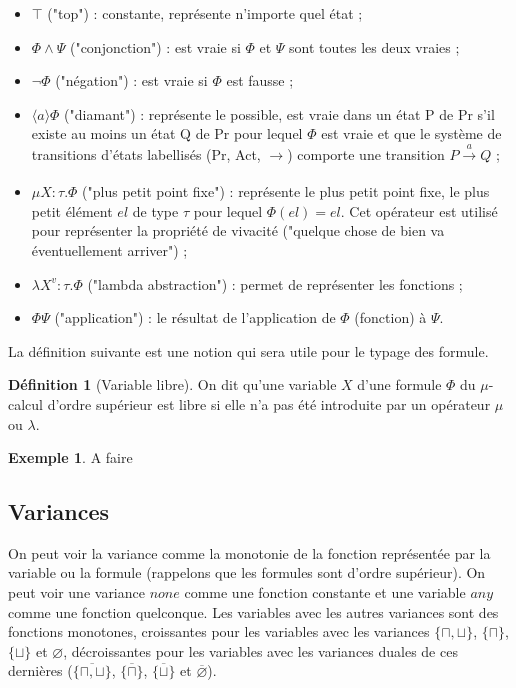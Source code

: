 \documentclass{rapport}
\theoremstyle{plain}
\theoremstyle{remark}
\theoremstyle{definition}
\newtheorem{dfn}{Définition}
\newtheorem{exem}{Exemple}
\begin{document}
\begin{itemize}
  \item $\top$ ("top") : constante, représente n'importe quel état ;
  \item $\Phi \wedge \Psi$ ("conjonction") : est vraie si $\Phi$ et $\Psi$ sont toutes les deux vraies ;
  \item $\neg\Phi$ ("négation") : est vraie si $\Phi$ est fausse ;
  \item $\langle a \rangle \Phi$ ("diamant") : représente le possible, est vraie dans un état P de Pr s'il existe au moins un état Q de Pr pour lequel $\Phi$ est vraie et que le système de transitions d'états labellisés (Pr, Act, $\rightarrow$) comporte une transition $P\xrightarrow[]{a} Q$ ;
  \item $\mu X : \tau . \Phi$ ("plus petit point fixe") : représente le plus petit point fixe, le plus petit élément $el$ de type $\tau$ pour lequel $\Phi (el) = el$. Cet opérateur est utilisé pour représenter la propriété de vivacité ("quelque chose de bien va éventuellement arriver") ; 
  \item $\lambda X^{v} : \tau . \Phi$ ("lambda abstraction") : permet de représenter les fonctions ;
  \item $\Phi \Psi$ ("application") : le résultat de l'application de $\Phi$ (fonction) à $\Psi$.
\end{itemize}

La définition suivante est une notion qui sera utile pour le typage des formule. 

\begin{dfn}[Variable libre] On dit qu'une variable $X$ d'une formule $\Phi$ du $\mu$-calcul d'ordre supérieur est libre si elle n'a pas été introduite par un opérateur $\mu$ ou $\lambda$. 
\end{dfn} 

\begin{exem}
A faire	
\end{exem}

\subsection{Variances\label{sec:variances}}

On peut voir la variance comme la monotonie de la fonction représentée par la variable ou la formule (rappelons que les formules sont d'ordre supérieur). On peut voir une variance $none$ comme une fonction constante et une variable $any$ comme une fonction quelconque. Les variables avec les autres variances sont des fonctions monotones, croissantes pour les variables avec les variances $\{\sqcap, \sqcup\}$, $\{\sqcap\}$, $\{\sqcup\}$ et $\varnothing$, décroissantes pour les variables avec les variances duales de ces dernières ($\overline{\{\sqcap, \sqcup\}}$, $\overline{\{\sqcap\}}$, $\overline{\{\sqcup\}}$ et $\overline{\varnothing}$).    
\end{document}
